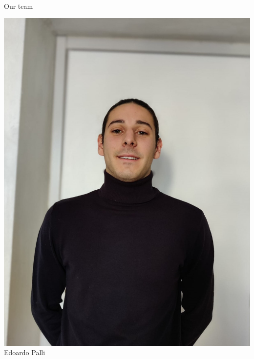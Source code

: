\documentclass{beamer}
\begin{document}
\begin{frame}{Our team}
\begin{minipage}{0.24\textwidth}
\begin{center}
			\includegraphics[width=\columnwidth]{edoardotaglio.jpeg}
			Edoardo Palli
		\end{center}
	\end{minipage}


\end{frame}
\end{document}
